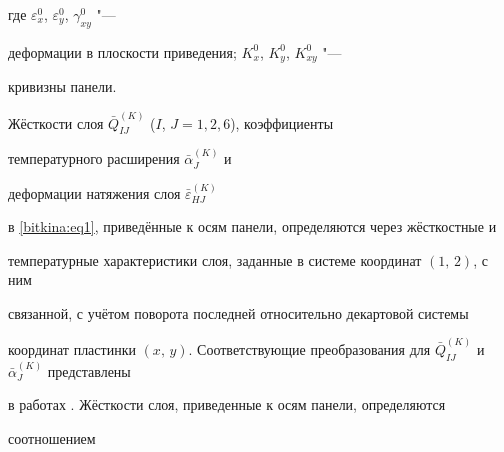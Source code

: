 где $\varepsilon _x^0$, $\varepsilon _y^0$, $\gamma _{xy}^0 $ "---

деформации в плоскости приведения; $K_x^0$, $K_y^0$, $K_{xy}^0 $ "---

кривизны панели.



Жёсткости слоя $\bar Q_{I\!J}^{(K)}$ ($I$, $J=1, 2, 6$), коэффициенты

температурного расширения $\bar \alpha_J^{(K)}$ и

деформации натяжения слоя $\bar \varepsilon_{HJ}^{(K)} $

 в \eqref{bitkina:eq1}, приведённые к осям панели, определяются через жёсткостные и

температурные характеристики слоя, заданные в системе координат $(1,\,2)$, с ним

связанной, с учётом поворота последней относительно декартовой системы

координат пластинки $(x,\,y)$. Соответствующие преобразования для $\bar

Q_{I\!J}^{(K)}$ и $\bar \alpha_J^{(K)} $ представлены

в работах \cite{bitkina:bib2,bitkina:bib4,bitkina:bib6}. Жёсткости слоя, приведенные к осям панели, определяются

соотношением

